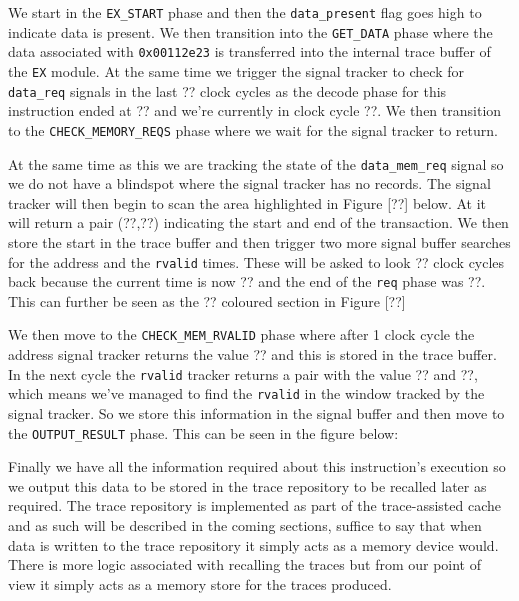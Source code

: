 We start in the \texttt{EX\_START} phase and then the \texttt{data\_present} flag goes high to indicate data is present. We then transition into the \texttt{GET\_DATA} phase where the data associated with \texttt{0x00112e23} is transferred into the internal trace buffer of the \texttt{EX} module. At the same time we trigger the signal tracker to check for \texttt{data\_req} signals in the last ?? clock cycles as the decode phase for this instruction ended at ?? and we're currently in clock cycle ??. We then transition to the \texttt{CHECK\_MEMORY\_REQS} phase where we wait for the signal tracker to return.

At the same time as this we are tracking the state of the \texttt{data\_mem\_req} signal so we do not have a blindspot where the signal tracker has no records. The signal tracker will then begin to scan the area highlighted in Figure [??] below. At it will return a pair (??,??) indicating the start and end of the transaction. We then store the start in the trace buffer and then trigger two more signal buffer searches for the address and the \texttt{rvalid} times. These will be asked to look ?? clock cycles back because the current time is now ?? and the end of the \texttt{req} phase was ??. This can further be seen as the ?? coloured section in Figure [??]



We then move to the \texttt{CHECK\_MEM\_RVALID} phase where after 1 clock cycle the address signal tracker returns the value ?? and this is stored in the trace buffer. In the next cycle the \texttt{rvalid} tracker returns a pair with the value ?? and ??, which means we've managed to find the \texttt{rvalid} in the window tracked by the signal tracker. So we store this information in the signal buffer and then move to the \texttt{OUTPUT\_RESULT} phase. This can be seen in the figure below:


Finally we have all the information required about this instruction's execution so we output this data to be stored in the trace repository to be recalled later as required. The trace repository is implemented as part of the trace-assisted cache and as such will be described in the coming sections, suffice to say that when data is written to the trace repository it simply acts as a memory device would. There is more logic associated with recalling the traces but from our point of view it simply acts as a memory store for the traces produced.

